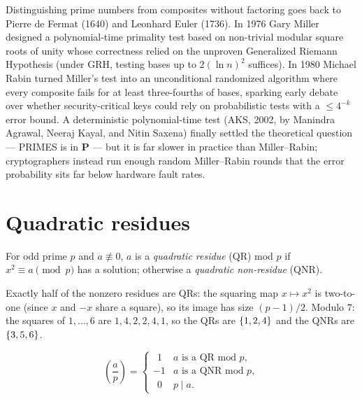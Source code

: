 \begin{historybox}
Distinguishing prime numbers from composites without factoring goes back to Pierre de Fermat (1640) and Leonhard Euler (1736). In 1976 Gary Miller designed a polynomial-time primality test based on non-trivial modular square roots of unity whose correctness relied on the unproven Generalized Riemann Hypothesis (under GRH, testing bases up to $2(\ln n)^2$ suffices). In 1980 Michael Rabin turned Miller's test into an unconditional randomized algorithm where every composite fails for at least three-fourths of bases, sparking early debate over whether security-critical keys could rely on probabilistic tests with a $\le 4^{-k}$ error bound. A deterministic polynomial-time test (AKS, 2002, by Manindra Agrawal, Neeraj Kayal, and Nitin Saxena) finally settled the theoretical question --- PRIMES is in $\mathbf{P}$ --- but it is far slower in practice than Miller--Rabin; cryptographers instead run enough random Miller--Rabin rounds that the error probability sits far below hardware fault rates.
\end{historybox}

\section{Quadratic residues}
\label{ch40:qr}

\begin{definition}
\label{ch40:def-qr}
For odd prime $p$ and $a\not\equiv 0$, $a$ is a \emph{quadratic residue} (QR) mod $p$ if $x^2\equiv a
\pmod p$ has a solution; otherwise a \emph{quadratic non-residue} (QNR).
\end{definition}

Exactly half of the nonzero residues are QRs: the squaring map $x\mapsto x^2$ is two-to-one (since
$x$ and $-x$ share a square), so its image has size $(p-1)/2$. Modulo $7$: the squares of
$1,\dots,6$ are $1,4,2,2,4,1$, so the QRs are $\{1,2,4\}$ and the QNRs are $\{3,5,6\}$.

\begin{definition}
\label{ch40:def-legendre}
\[
  \left(\frac{a}{p}\right) =
  \begin{cases}
    \ \ 1 & a \text{ is a QR mod } p,\\
    -1 & a \text{ is a QNR mod } p,\\
    \ \ 0 & p\mid a.
  \end{cases}
\]
\end{definition}

